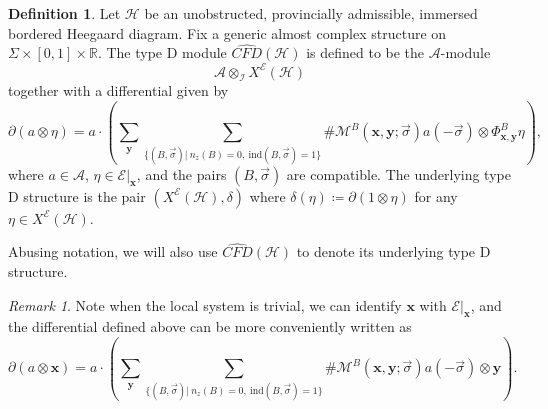 \documentclass{amsart}
\theoremstyle{definition}
\newtheorem{defn}[thm]{Definition}
\theoremstyle{remark}
\newtheorem{rmk}[thm]{Remark}
\numberwithin{equation}{section}
\numberwithin{equation}{section} \makeatletter
\begin{document}
\begin{defn}\label{Definition, type D structure}
Let $\mathcal{H}$ be an unobstructed, provincially admissible, immersed bordered Heegaard diagram. Fix a generic almost complex structure on $\Sigma\times [0,1] \times \mathbb{R}$. The type D module $\widehat{CFD}(\mathcal{H})$ is defined to be the $\mathcal{A}$-module $$\mathcal{A}\otimes_{\mathcal{I}}X^\mathcal{E}(\mathcal{H})$$ together with a differential given by
$$\partial (a\otimes \eta)=a\cdot(\sum_{\bm{y}}\sum_{\{(B,\overrightarrow{\sigma})|\ n_z(B)=0,\ \text{ind}(B,\overrightarrow{\sigma})=1\}}\#\mathcal{M}^B(\bm{x},\bm{y};\overrightarrow{\sigma})a(-\overrightarrow{\sigma})\otimes \Phi^B_{\bm{x},\bm{y}}\eta),$$
where $a\in\mathcal{A}$, $\eta\in \mathcal{E}|_{\bm{x}}$, and the pairs $(B,\overrightarrow{\sigma})$ are compatible. The underlying type D structure is the pair $(X^\mathcal{E}(\mathcal{H}), \delta)$ where $\delta(\eta)\coloneqq \partial(1\otimes \eta)$ for any $\eta\in X^\mathcal{E}(\mathcal{H})$.
\end{defn}
Abusing notation, we will also use $\widehat{CFD}(\mathcal{H})$ to denote its underlying type D structure. 
\begin{rmk}
Note when the local system is trivial, we can identify $\bm{x}$ with $\mathcal{E}|_{\bm{x}}$, and the differential defined above can be more conveniently written as
$$\partial (a\otimes\bm{x})=a\cdot(\sum_{\bm{y}}\sum_{\{(B,\overrightarrow{\sigma})|\ n_z(B)=0,\ \text{ind}(B,\overrightarrow{\sigma})=1\}}\#\mathcal{M}^B(\bm{x},\bm{y};\overrightarrow{\sigma})a(-\overrightarrow{\sigma})\otimes \bm{y}).$$
\end{rmk}
\end{document}

